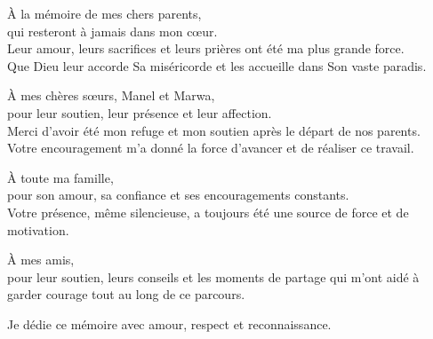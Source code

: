 \begin{center}
    \vspace*{1cm}

    À la mémoire de mes chers parents,\\
    qui resteront à jamais dans mon cœur.\\
    Leur amour, leurs sacrifices et leurs prières ont été ma plus grande force.\\
    Que Dieu leur accorde Sa miséricorde et les accueille dans Son vaste paradis.

    \vspace{0.6cm}

    À mes chères sœurs, Manel et Marwa,\\
    pour leur soutien, leur présence et leur affection.\\
    Merci d'avoir été mon refuge et mon soutien après le départ de nos parents.\\
    Votre encouragement m'a donné la force d'avancer et de réaliser ce travail.

    \vspace{0.6cm}

    À toute ma famille,\\
    pour son amour, sa confiance et ses encouragements constants.\\
    Votre présence, même silencieuse, a toujours été une source de force et de motivation.

    \vspace{0.6cm}

    À mes amis,\\
    pour leur soutien, leurs conseils et les moments de partage qui m'ont aidé à garder courage tout au long de ce parcours.

    \vspace{0.8cm}

    Je dédie ce mémoire avec amour, respect et reconnaissance.
\end{center}
